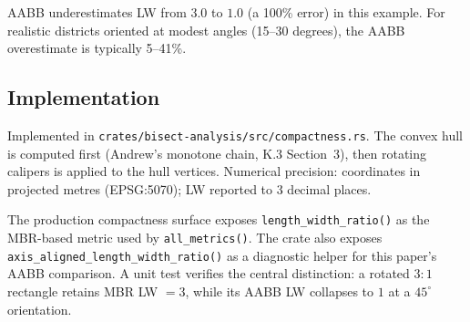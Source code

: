 AABB underestimates LW from $3.0$ to $1.0$ (a 100\% error) in this example.
For realistic districts oriented at modest angles (15--30 degrees),
the AABB overestimate is typically 5--41\%.

\subsection{Implementation}

Implemented in \texttt{crates/bisect-analysis/src/compactness.rs}.
The convex hull is computed first (Andrew's monotone chain, K.3 Section~3),
then rotating calipers is applied to the hull vertices.
Numerical precision: coordinates in projected metres (EPSG:5070);
LW reported to 3 decimal places.

The production compactness surface exposes
\texttt{length\_width\_ratio()} as the MBR-based metric used by
\texttt{all\_metrics()}.  The crate also exposes
\texttt{axis\_aligned\_length\_width\_ratio()} as a diagnostic helper for this
paper's AABB comparison.  A unit test verifies the central distinction: a
rotated $3{:}1$ rectangle retains MBR LW $=3$, while its AABB LW collapses to
$1$ at a $45^\circ$ orientation.
